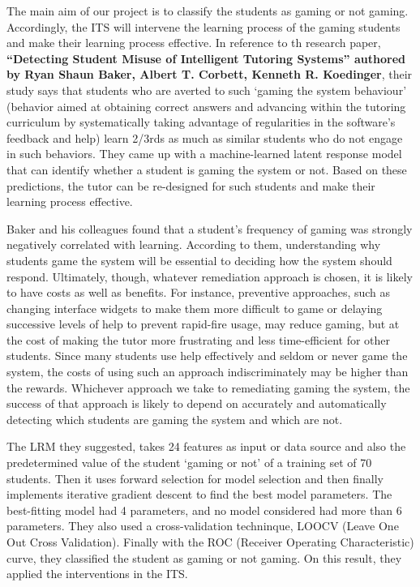 \documentclass[a4paper,12pt,oneside]{sphinxmanual}
\begin{document}
The main aim of our project is to classify the students as gaming or not gaming. Accordingly, the ITS will intervene the learning process of the gaming students and make their learning process effective. In reference to th research paper, \textbf{“Detecting Student Misuse of Intelligent Tutoring Systems” authored by Ryan Shaun Baker, Albert T. Corbett, Kenneth R. Koedinger}, their study says that students who are averted to such `gaming the system behaviour' (behavior aimed at obtaining correct answers and advancing within the tutoring curriculum by systematically taking advantage of regularities in the software’s feedback and help) learn 2/3rds as much as similar students who do not engage in such behaviors. They came up with a machine-learned latent response model that can identify whether a student is gaming the system or not. Based on these predictions, the tutor can be re-designed for such students and make their learning process effective.

Baker and his colleagues found that a student’s frequency of gaming was strongly negatively correlated with learning. According to them, understanding why students game the system will be essential to deciding how the system should respond. Ultimately, though, whatever remediation approach is chosen, it is likely to have costs as well as benefits. For instance, preventive approaches, such as changing interface widgets to make them more difficult to game or delaying successive levels of help to prevent rapid-fire usage, may reduce gaming, but at the cost of making the tutor more frustrating and less time-efficient for other students. Since many students use help effectively and seldom or never game the system, the costs of using such an approach indiscriminately may be higher than the rewards. Whichever approach we take to remediating gaming the system, the success of that approach is likely to depend on accurately and automatically detecting which students are gaming the system and which are not.

The LRM they suggested, takes 24 features as input or data source and also the predetermined value of the student `gaming or not' of a training set of 70 students. Then it uses forward selection for model selection and then finally implements iterative gradient descent to find the best model parameters. The best-fitting model had 4 parameters, and no model considered had more than 6 parameters. They also used a cross-validation techninque, LOOCV (Leave One Out Cross Validation). Finally with the ROC (Receiver Operating Characteristic) curve, they classified the student as gaming or not gaming. On this result, they applied the interventions in the ITS.
\end{document}

